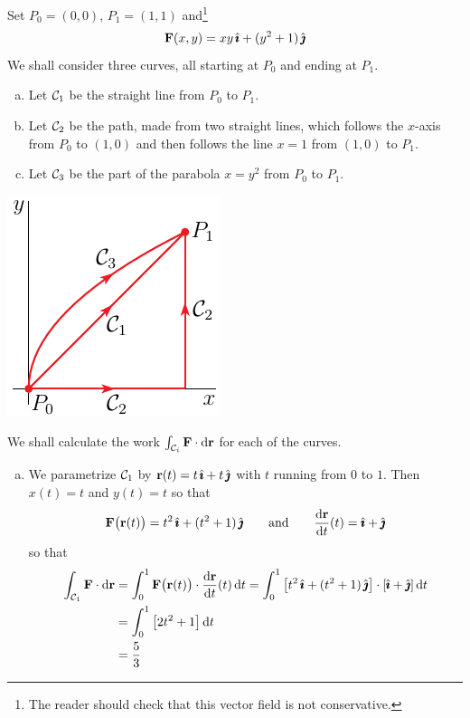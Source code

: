 \begin{eg}\label{eg:workIntegalA}
Set $P_0=(0,0)$, $P_1=(1,1)$ and\footnote{The reader should check that this
vector field is not conservative.}
\begin{equation*}
\mathbf{F}(x,y) = xy\,\hat{\pmb{\imath}} + (y^2+1)\,\hat{\pmb{\jmath}}
\end{equation*}
We shall consider three curves, all starting at $P_0$ and ending at $P_1$.
\begin{enumerate}[(a)]
\item 
Let $\mathcal{C}_1$ be the straight line from $P_0$ to $P_1$.
\item 
Let $\mathcal{C}_2$ be the path, made from two straight lines, 
which follows the $x$-axis from $P_0$ to $(1,0)$
and then follows the line $x=1$ from $(1,0)$ to $P_1$.
\item 
Let $\mathcal{C}_3$ be the part of the parabola $x=y^2$ from $P_0$ to $P_1$.
\end{enumerate}
\begin{efig}
\begin{center}
    \includegraphics{workIntegralA.pdf}
\end{center}
\end{efig}
We shall calculate the work $\int_{\mathcal{C}_i}\mathbf{F}\cdot\mathrm{d}\mathbf{r}$ for each of 
the curves.
\begin{enumerate}[(a)]
\item 
We parametrize $\mathcal{C}_1$ by $\mathbf{r}(t) = t\,\hat{\pmb{\imath}}+t\,\hat{\pmb{\jmath}}$ with $t$ running from $0$ to $1$.
Then $x(t)=t$ and $y(t)=t$ so that
\begin{equation*}
\vF\big(\vr(t)\big) = t^2\,\hi + (t^2+1)\,\hj\qquad\text{and}\qquad
\diff{\vr}{t}(t) = \hi + \hj
\end{equation*}
so that
\begin{align*}
\int_{\cC_1}\vF\cdot\dee{\vr}
&=\int_{0}^{1}\vF\big(\vr(t)\big)\cdot\diff{\vr}{t}(t)\,\dee{t}
=\int_{0}^{1}\big[t^2\,\hi + (t^2+1)\,\hj\big]\cdot[\hi + \hj]\,\dee{t} \\
&=\int_{0}^{1}\big[2t^2+1\big]\,\dee{t} \\
&=\frac{5}{3}
\end{align*}


\end{enumerate}
\end{eg}
